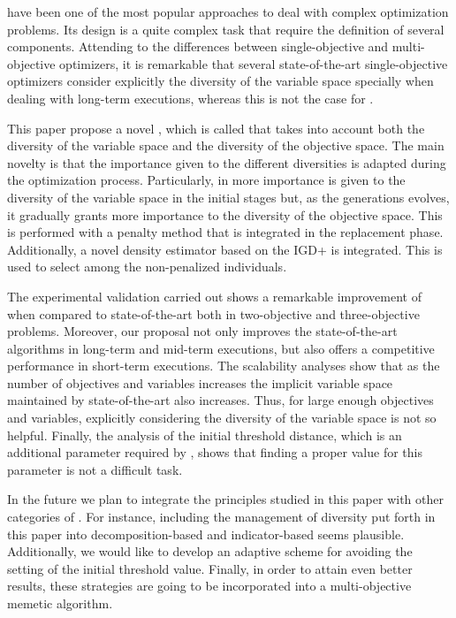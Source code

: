 \EAS{} have been one of the most popular approaches to deal with complex optimization problems.
%
Its design is a quite complex task that require the definition of several components.
%
Attending to the differences between single-objective and multi-objective optimizers, it is remarkable
that several state-of-the-art single-objective optimizers consider explicitly the diversity of the variable space specially
when dealing with long-term executions, whereas this is not the case for \MOEAS{}.

This paper propose a novel \MOEA{}, which is called \VSDMOEA{} that takes into account both the diversity of the variable space
and the diversity of the objective space.
%
The main novelty is that the importance given to the different diversities is adapted during the optimization process.
%
Particularly, in \VSDMOEA{} more importance is given to the diversity of the variable space in the initial stages
but, as the generations evolves, it gradually grants more importance to the diversity of the objective space.
%
This is performed with a penalty method that is integrated in the replacement phase.
%
Additionally, a novel density estimator based on the IGD+ is integrated.
%
This is used to select among the non-penalized individuals.

The experimental validation carried out shows a remarkable improvement of \VSDMOEA{} when compared to state-of-the-art \MOEAS{} both in
two-objective and three-objective problems.
%
Moreover, our proposal not only improves the state-of-the-art algorithms in long-term and mid-term executions,
but also offers a competitive performance in short-term executions.
%
The scalability analyses show that as the number of objectives and variables increases the implicit variable space maintained by state-of-the-art
\MOEAS{} also increases.
%
Thus, for large enough objectives and variables, explicitly considering the diversity of the variable space is not so helpful.
%
Finally, the analysis of the initial threshold distance, which is an additional parameter required by \VSDMOEA{}, shows that finding a proper
value for this parameter is not a difficult task.

In the future we plan to integrate the principles studied in this paper with other categories of \MOEAS{}.
%
For instance, including the management of diversity put forth in this paper into decomposition-based and indicator-based \MOEAS{} seems plausible.
%
Additionally, we would like to develop an adaptive scheme for avoiding the setting of the initial threshold value.
%
Finally, in order to attain even better results, these strategies are going to be incorporated into a multi-objective memetic algorithm.
%
